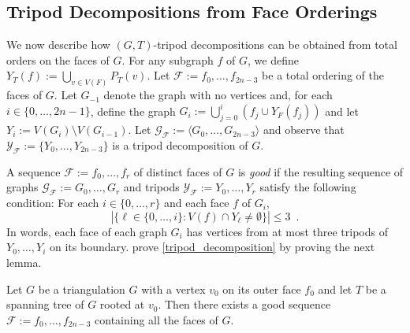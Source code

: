 \documentclass{patmorin}
\begin{document}

\subsection{Tripod Decompositions from Face Orderings}
\label{orderings}

We now describe how $(G,T)$-tripod decompositions can be obtained from total orders on the faces of $G$.  For any subgraph $f$ of $G$, we define $Y_T(f):=\bigcup_{v\in V(F)} P_T(v)$.  Let $\mathcal{F}:=f_0,\ldots,f_{2n-3}$ be a total ordering of the faces of $G$. Let $G_{-1}$ denote the graph with no vertices and, for each $i\in\{0,\ldots,2n-1\}$, define the graph $G_i:=\bigcup_{j=0}^i (f_j\cup Y_F(f_j))$ and let $Y_i:=V(G_i)\setminus V(G_{i-1})$.
Let $\mathcal{G_F}:=\langle G_0,\ldots,G_{2n-3}\rangle$ and
observe that $\mathcal{Y_F}:=\{Y_0,\ldots,Y_{2n-3}\}$ is a tripod decomposition of $G$.


A sequence $\mathcal{F}:=f_0,\ldots,f_r$ of distinct faces of $G$ is \emph{good} if the resulting sequence of graphs $\mathcal{G}_\mathcal{F}:=G_0,\ldots,G_r$ and tripods $\mathcal{Y}_\mathcal{F}:=Y_0,\ldots,Y_r$ satisfy the following condition:  For each $i\in\{0,\ldots, r\}$ and each face $f$ of $G_i$,
\[
   |\{\ell\in\{0,\ldots,i\}: V(f)\cap Y_{\ell}\neq\emptyset\}|\le 3 \enspace .
\]
In words, each face of each graph $G_i$ has vertices from at most three tripods of $Y_0,\ldots,Y_i$ on its boundary.  \citet{dujmovic.joret.ea:planar} prove \cref{tripod_decomposition} by proving the next lemma.


\begin{lem}\label{face_trick}
  Let $G$ be a triangulation $G$ with a vertex $v_0$ on its outer face $f_0$ and let $T$ be a spanning tree of $G$ rooted at $v_0$.  Then there exists a good sequence $\mathcal{F}:=f_0,\ldots,f_{2n-3}$ containing all the faces of $G$.
\end{lem}
\end{document}
